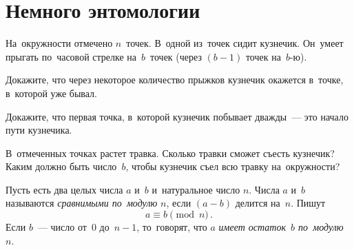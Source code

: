 
\section*{Немного энтомологии}


На~окружности отмечено $n$~точек.
В~одной из~точек сидит кузнечик.
Он~умеет прыгать по~часовой стрелке на~$b$~точек
(через $(b - 1)$ точек на~$b$-ю).

\begin{problems}

Докажите, что через некоторое количество прыжков кузнечик окажется в~точке,
в~которой уже бывал.

\item
Докажите, что первая точка, в~которой кузнечик побывает дважды~--- это начало
пути кузнечика.

\item
В~отмеченных точках растет травка.
Сколько травки сможет съесть кузнечик?
Каким должно быть число~$b$, чтобы кузнечик съел всю травку на~окружности?

\end{problems}

Пусть есть два целых числа $a$ и~$b$ и~натуральное число $n$.
Числа $a$ и~$b$ называются \emph{сравнимыми по~модулю} $n$, если
$(a - b)$ делится на~$n$.
Пишут
\[
    a \equiv b \pmod n
\,.\]
Если $b$~--- число от~$0$ до~$n - 1$, то~говорят, что $a$
\emph{имеет остаток~$b$ по~модулю~$n$}.

